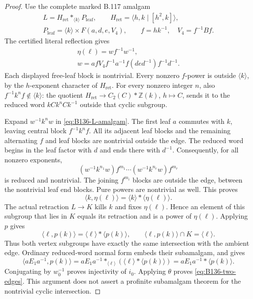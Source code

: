 \begin{proof}
Use the complete marked B.117 amalgam
\begin{equation}\label{eq:B136-L-amalgam}
 \begin{gathered}
 L=H_{\mathrm{ret}}*_{\langle k\rangle}P_{\mathrm{leaf}},\qquad
 H_{\mathrm{ret}}=\langle h,k\mid[h^2,k]\rangle,\\
 P_{\mathrm{leaf}}=\langle k\rangle\times F(a,d,e,V_4),
 \qquad f=hk^{-1},\quad V_4=f^{-1}Bf.
 \end{gathered}
\end{equation}
The certified literal reflection gives
\begin{equation}\label{eq:B136-branch-word}
 \begin{gathered}
 \eta(\ell)=wf^{-1}w^{-1},\\
 w=afV_4f^{-1}a^{-1}f(de d^{-1})f^{-1}d^{-1}.
 \end{gathered}
\end{equation}
Each displayed free-leaf block is nontrivial. Every nonzero
$f$-power is outside $\langle k\rangle$, by the $h$-exponent
character of $H_{\mathrm{ret}}$. For every nonzero integer $n$,
also $f^{-1}k^nf\notin\langle k\rangle$: the quotient
$H_{\mathrm{ret}}\to C_2(C)*\mathbb Z(k)$, $h\mapsto C$,
sends it to the reduced word $kCk^nCk^{-1}$ outside that cyclic
subgroup.

Expand $w^{-1}k^nw$ in \eqref{eq:B136-L-amalgam}.
The first leaf $a$ commutes with $k$, leaving central block
$f^{-1}k^nf$. All its adjacent leaf blocks and the remaining
alternating $f$ and leaf blocks are nontrivial outside the edge.
The reduced word begins in the leaf factor with $d$ and ends
there with $d^{-1}$. Consequently, for all nonzero exponents,
\[
 (w^{-1}k^{n_1}w)f^{m_1}\cdots
 (w^{-1}k^{n_r}w)f^{m_r}
\]
is reduced and nontrivial. The joining $f^{m_i}$ blocks are
outside the edge, between the nontrivial leaf end blocks.
Pure powers are nontrivial as well. This proves
\[
 \langle k,\eta(\ell)\rangle
     =\langle k\rangle*\langle\eta(\ell)\rangle.
\]
The actual retraction $L\to K$ kills $k$ and fixes
$\eta(\ell)$. Hence an element of this subgroup that lies in
$K$ equals its retraction and is a power of $\eta(\ell)$.
Applying $p$ gives
\[
 \langle\ell,p(k)\rangle
      =\langle\ell\rangle*\langle p(k)\rangle,
 \qquad \langle\ell,p(k)\rangle\cap K=\langle\ell\rangle.
\]
Thus both vertex subgroups have exactly the same intersection
with the ambient edge. Ordinary reduced-word normal form
embeds their subamalgam, and gives
\[
 \langle aE_1a^{-1},p(k)\rangle
 =aE_1a^{-1}*_{\langle\ell\rangle}
      (\langle\ell\rangle*\langle p(k)\rangle)
 =aE_1a^{-1}*\langle p(k)\rangle.
\]
Conjugating by $w_0^{-1}$ proves injectivity of $i_0$.
Applying $\theta$ proves \eqref{eq:B136-two-edges}.
This argument does not assert a profinite subamalgam theorem
for the nontrivial cyclic intersection.


\end{proof}

